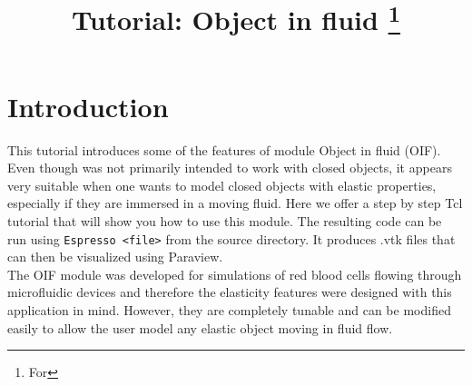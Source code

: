 \documentclass[
a4paper,                        %
11pt,                           %
twoside,                        %
footsepline,                    %
headsepline,                    %
headexclude,                    %
footexclude,                    %
pagesize,                       %
]{scrartcl}
\begin{document}
\esptitlehead
\title{Tutorial: Object in fluid
\ifdefined\esversion
\thanks{For \es \esversion}
\fi
}

\maketitle
\tableofcontents

\section{Introduction}

This tutorial introduces some of the features of \es module Object in fluid (OIF). Even though \es was not primarily intended to work with closed objects, it appears very suitable when one wants to model closed objects with elastic properties, especially if they are immersed in a moving fluid. Here we offer a step by step Tcl tutorial that will show you how to use this module. The resulting code can be run using \verb|Espresso <file>| from the \es source directory. It produces .vtk files that can then be visualized using Paraview.\\

The OIF module was developed for simulations of red blood cells flowing through microfluidic devices and therefore the elasticity features were designed with this application in mind. However, they are completely tunable and can be modified easily to allow the user model any elastic object moving in fluid flow.  
\end{document}
